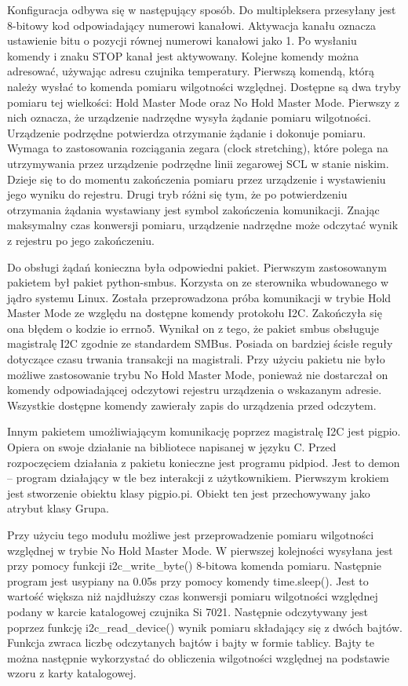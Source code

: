 \documentclass[a4paper,12pt,twoside]{article}
\begin{document}
Konfiguracja odbywa się w następujący sposób. Do multipleksera przesyłany jest 8-bitowy kod odpowiadający numerowi kanałowi. Aktywacja kanału oznacza ustawienie bitu o pozycji równej numerowi kanałowi jako 1. Po wysłaniu komendy i znaku STOP kanał jest aktywowany. Kolejne komendy można adresować, używając adresu czujnika temperatury. Pierwszą komendą, którą należy wysłać to komenda pomiaru wilgotności względnej. Dostępne są dwa tryby pomiaru tej wielkości: Hold Master Mode oraz No Hold Master Mode. Pierwszy z nich oznacza, że urządzenie nadrzędne wysyła żądanie pomiaru wilgotności. Urządzenie podrzędne potwierdza otrzymanie żądanie i dokonuje pomiaru. Wymaga to zastosowania rozciągania zegara (clock stretching), które polega na utrzymywania przez urządzenie podrzędne linii zegarowej SCL w stanie niskim. Dzieje się to do momentu zakończenia pomiaru przez urządzenie i wystawieniu jego wyniku do rejestru. Drugi tryb różni się tym, że po potwierdzeniu otrzymania żądania wystawiany jest symbol zakończenia komunikacji. Znając maksymalny czas konwersji pomiaru, urządzenie nadrzędne może odczytać wynik z rejestru po jego zakończeniu. 

Do obsługi żądań konieczna była odpowiedni pakiet. Pierwszym zastosowanym pakietem był pakiet python-smbus. Korzysta on ze sterownika wbudowanego w jądro systemu Linux. Została przeprowadzona próba komunikacji w trybie Hold Master Mode ze względu na dostępne komendy protokołu I2C. Zakończyła się ona błędem o kodzie io errno5. Wynikał on z tego, że pakiet smbus obsługuje magistralę I2C zgodnie ze standardem SMBus. Posiada on bardziej ścisłe reguły dotyczące czasu trwania transakcji na magistrali. Przy użyciu pakietu nie było możliwe zastosowanie trybu No Hold Master Mode, ponieważ nie dostarczał on komendy odpowiadającej odczytowi rejestru urządzenia o wskazanym adresie. Wszystkie dostępne komendy zawierały zapis do urządzenia przed odczytem.

Innym pakietem umożliwiającym komunikację poprzez magistralę I2C jest pigpio. Opiera on swoje działanie na bibliotece napisanej w języku C. Przed rozpoczęciem działania z pakietu konieczne jest programu pidpiod. Jest to demon -- program działający w tle bez interakcji z użytkownikiem. Pierwszym krokiem jest stworzenie obiektu klasy pigpio.pi. Obiekt ten jest przechowywany jako atrybut klasy Grupa. 

Przy użyciu tego modułu możliwe jest przeprowadzenie pomiaru wilgotności względnej w trybie No Hold Master Mode. W pierwszej kolejności wysyłana jest przy pomocy funkcji i2c{\_}write{\_}byte() 8-bitowa komenda pomiaru. Następnie program jest usypiany na 0.05s przy pomocy komendy time.sleep(). Jest to wartość większa niż najdłuższy czas konwersji pomiaru wilgotności względnej podany w karcie katalogowej czujnika Si 7021. Następnie odczytywany jest poprzez funkcję i2c{\_}read{\_}device() wynik pomiaru składający się z dwóch bajtów. Funkcja zwraca liczbę odczytanych bajtów i bajty w formie tablicy. Bajty te można następnie wykorzystać do obliczenia wilgotności względnej na podstawie wzoru z karty katalogowej. 
\end{document}
